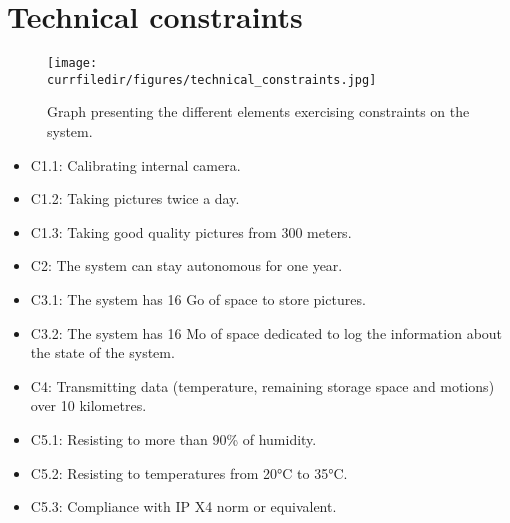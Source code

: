 \tab
\newpage
\section{Technical constraints}

\begin{figure}[!h]
    \centering
    \texttt{[image: \\currfiledir/figures/technical\_constraints.jpg]}
    \caption{Graph presenting the different elements exercising constraints on the system.}
\end{figure}

\begin{itemize}[label=]
    \item C1.1: Calibrating internal camera.
    \item C1.2: Taking pictures twice a day.
    \item C1.3: Taking good quality pictures from 300 meters.
    \item C2: The system can stay autonomous for one year.
    \item C3.1: The system has 16 Go of space to store pictures.
    \item C3.2: The system has 16 Mo of space dedicated to log the information about the state of the system.
    \item C4: Transmitting data (temperature, remaining storage space and motions) over 10 kilometres.
    \item C5.1: Resisting to more than 90\% of humidity.
    \item C5.2: Resisting to temperatures from 20°C to 35°C.
    \item C5.3: Compliance with IP X4 norm or equivalent.
\end{itemize}
